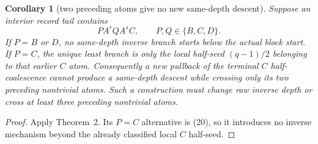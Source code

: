\documentclass[11pt]{article}
\newtheorem{corollary}[theorem]{Corollary}
\begin{document}
\begin{corollary}[two preceding atoms give no new same-depth descent]
Suppose an interior record tail contains
\[
 P A^r Q A^s C,
 \qquad P,Q\in\{B,C,D\}.
 \tag{28}
\]
If $P=B$ or $D$, no same-depth inverse branch starts below the actual
block start.  If $P=C$, the unique least branch is only the local
half-seed $(q-1)/2$ belonging to that earlier $C$ atom.  Consequently a
new pullback of the terminal $C$ half-coalescence cannot produce a
same-depth descent while crossing only its two preceding nontrivial
atoms.  Such a construction must change raw inverse depth or cross at
least three preceding nontrivial atoms.
\end{corollary}

\begin{proof}
Apply Theorem~2.  Its $P=C$ alternative is (20), so it introduces no
inverse mechanism beyond the already classified local $C$ half-seed.
\end{proof}
\end{document}
